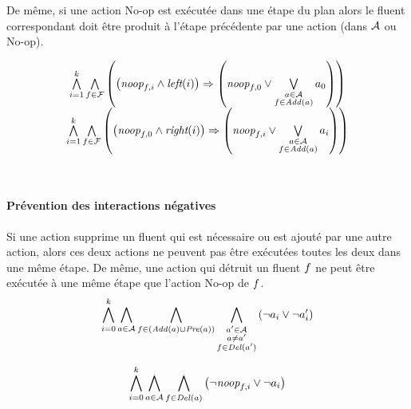 De même, si une action No-op est exécutée dans une étape du plan alors le fluent correspondant doit être produit à l'étape précédente par une action (dans $\mathcal{A}$ ou No-op).

\begin{small}
\[
\begin{matrix}
\bigwedge\limits_{\substack{i=1}}^{k} \bigwedge\limits_{\substack{f\in \mathcal{F}}} \left(\left(\textit{noop}_{f,i} \wedge \textit{left}(i) \right) \Rightarrow \left(\textit{noop}_{f,0} \vee \bigvee\limits_{\substack{a \in \mathcal{A} \\ f \in \mathit{Add}(a)}} a_{0}\right)\right)\\
\bigwedge\limits_{\substack{i=1}}^{k}\bigwedge\limits_{\substack{f\in \mathcal{F}}}\left(\left(\textit{noop}_{f,0} \wedge \textit{right}(i) \right) \Rightarrow \left(\textit{noop}_{f,i} \vee \bigvee\limits_{\substack{a \in \mathcal{A} \\ f \in \mathit{Add}(a)}} a_{i}\right)\right)
\end{matrix}
\]
\end{small}\\

\paragraph*{Prévention des interactions négatives}

Si une action supprime un fluent qui est nécessaire ou est ajouté par une autre action, alors ces deux actions ne peuvent pas être exécutées toutes les deux dans une même étape. De même, une action qui détruit un fluent $f$ ne peut être exécutée à une même étape que l'action No-op de $f$.
\[ \bigwedge\limits_{\substack{i=0}}^{k} \bigwedge\limits_{\substack{a \in \mathcal{A}}} \bigwedge\limits_{\substack{f\in \left(\mathit{Add}(a) \cup \mathit{Pre}(a)\right)}} \bigwedge\limits_{\substack{a' \in \mathcal{A} \\ a \neq a' \\ f \in \mathit{Del}(a')}}\left(\neg a_{i} \vee \neg a'_{i}\right) \]

\[ \bigwedge\limits_{\substack{i=0}}^{k} \bigwedge\limits_{\substack{a\in \mathcal{A}}} \bigwedge\limits_{\substack{f \in \mathit{Del}(a)}}\left(\neg \textit{noop}_{f,i} \vee \neg a_{i}\right) \]


